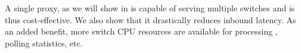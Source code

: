 A single proxy, as we will show in  is capable of
serving multiple switches and is thus cost-effective. We also show that it
drastically reduces inbound latency. As an added benefit, more switch CPU
resources are available for processing , polling statistics, etc.
  






